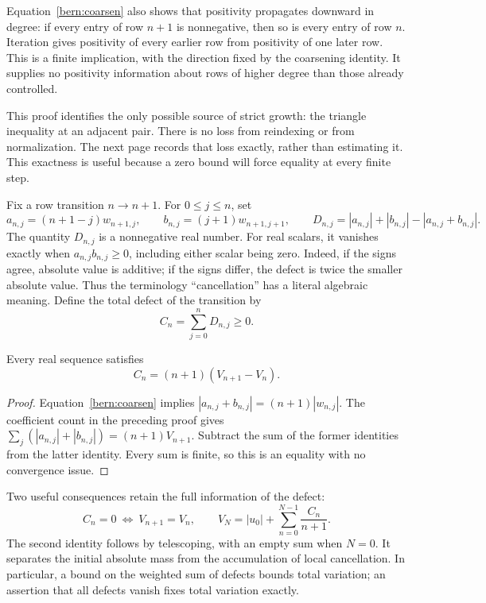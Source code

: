 Equation~\eqref{bern:coarsen} also shows that positivity propagates
downward in degree: if every entry of row $n+1$ is nonnegative,
then so is every entry of row $n$. Iteration gives positivity of
every earlier row from positivity of one later row. This is a
finite implication, with the direction fixed by the coarsening
identity. It supplies no positivity information about rows of higher
degree than those already controlled.

This proof identifies the only possible source of strict growth:
the triangle inequality at an adjacent pair. There is no loss from
reindexing or from normalization. The next page records that loss
exactly, rather than estimating it. This exactness is useful because
a zero bound will force equality at every finite step.

\label{bern:cancellation-page}

Fix a row transition $n\to n+1$. For $0\le j\le n$, set
\[
 a_{n,j}=(n+1-j)w_{n+1,j},\qquad
 b_{n,j}=(j+1)w_{n+1,j+1},\qquad
 D_{n,j}=|a_{n,j}|+|b_{n,j}|-|a_{n,j}+b_{n,j}|.
\]
The quantity $D_{n,j}$ is a nonnegative real number. For real scalars,
it vanishes exactly when $a_{n,j}b_{n,j}\ge0$, including either scalar
being zero. Indeed, if the signs agree, absolute value is additive;
if the signs differ, the defect is twice the smaller absolute value.
Thus the terminology ``cancellation'' has a literal algebraic meaning.
Define the total defect of the transition by
\[
 C_n=\sum_{j=0}^nD_{n,j}\ge0.
\]

\begin{proposition}\label{bern:increment}
Every real sequence satisfies
\begin{equation}\label{bern:increment-eq}
 C_n=(n+1)(V_{n+1}-V_n).
\end{equation}
\end{proposition}
\begin{proof}
Equation~\eqref{bern:coarsen} implies
$|a_{n,j}+b_{n,j}|=(n+1)|w_{n,j}|$.
The coefficient count in the preceding proof gives
$\sum_j(|a_{n,j}|+|b_{n,j}|)=(n+1)V_{n+1}$.
Subtract the sum of the former identities from the latter identity.
Every sum is finite, so this is an equality with no convergence issue.
\end{proof}

Two useful consequences retain the full information of the defect:
\[
 C_n=0\ \Longleftrightarrow\ V_{n+1}=V_n,
 \qquad
 V_N=|u_0|+\sum_{n=0}^{N-1}\frac{C_n}{n+1}.
\]
The second identity follows by telescoping, with an empty sum when
$N=0$. It separates the initial absolute mass from the accumulation of
local cancellation. In particular, a bound on the weighted sum of
defects bounds total variation; an assertion that all defects vanish
fixes total variation exactly.

